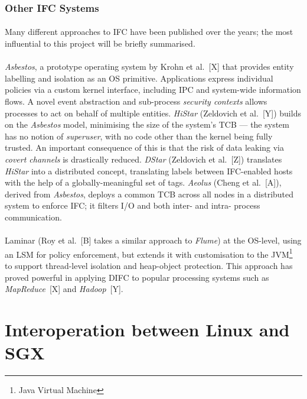 \subsubsection{Other IFC Systems}
\paragraph{} Many different approaches to IFC have been published over the years; the most influential to this project will be briefly summarised.

\paragraph{} \textit{Asbestos}, a prototype operating system by Krohn et al.~[X] that provides entity labelling and isolation as an OS primitive. Applications express individual policies via a custom kernel interface, including IPC and system-wide information flows. A novel event abstraction and sub-process \textit{security contexts} allows processes to act on behalf of multiple entities. \textit{HiStar} (Zeldovich et al.~[Y]) builds on the \textit{Asbestos} model, minimising the size of the system's TCB --- the system has no notion of \textit{superuser}, with no code other than the kernel being fully trusted. An important consequence of this is that the risk of data leaking via \textit{covert channels} is drastically reduced. \textit{DStar} (Zeldovich et al.~[Z]) translates \textit{HiStar} into a distributed concept, translating labels between IFC-enabled hosts with the help of a globally-meaningful set of tags. \textit{Aeolus} (Cheng et al.~[A]), derived from \textit{Asbestos}, deploys a common TCB across all nodes in a distributed system to enforce IFC; it filters I/O and both inter- and intra- process communication.

\paragraph{} Laminar (Roy et al.~[B] takes a similar approach to \textit{Flume}) at the OS-level, using an LSM for policy enforcement, but extends it with customisation to the JVM\footnote{Java Virtual Machine} to support thread-level isolation and heap-object protection. This approach has proved powerful in applying DIFC to popular processing systems such as \textit{MapReduce}~[X] and \textit{Hadoop}~[Y].


\section{Interoperation between Linux and SGX} 
